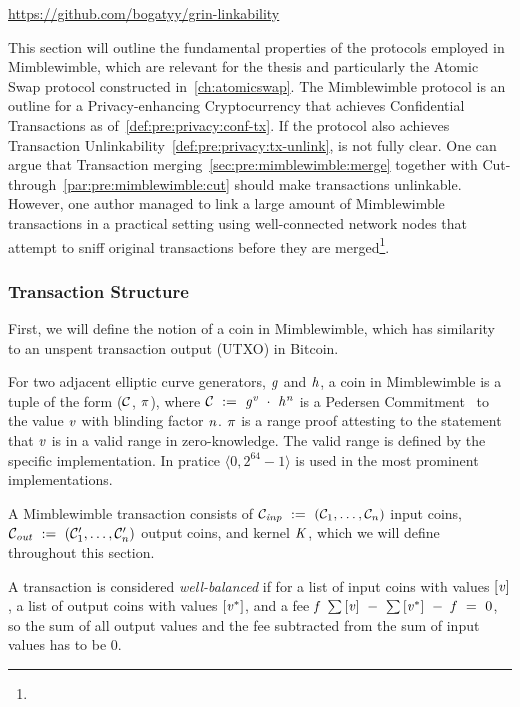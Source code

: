 \urldef\urlmwbreak\url{https://github.com/bogatyy/grin-linkability}

This section will outline the fundamental properties of the protocols employed in Mimblewimble, which are relevant for the thesis and particularly the Atomic Swap protocol constructed in~\cref{ch:atomicswap}.
The Mimblewimble protocol is an outline for a Privacy-enhancing Cryptocurrency that achieves Confidential Transactions as of~\cref{def:pre:privacy:conf-tx}.
If the protocol also achieves Transaction Unlinkability~\cref{def:pre:privacy:tx-unlink}, is not fully clear.
One can argue that Transaction merging~\cref{sec:pre:mimblewimble:merge} together with Cut-through~\cref{par:pre:mimblewimble:cut} should make transactions unlinkable.
However, one author managed to link a large amount of Mimblewimble transactions in a practical setting using well-connected network nodes that attempt to sniff original transactions before they are merged\footnote{\urlmwbreak}.

\subsubsection{Transaction Structure} \label{subsec:pre:mimblwimble-tx}

First, we will define the notion of a coin in Mimblewimble, which has similarity to an unspent transaction output (UTXO) in Bitcoin.
\begin{definition}\label{def:pre:coin}
    For two adjacent elliptic curve generators, $\mathit{g}$ and $\mathit{h}$, a coin in Mimblewimble is a tuple of the form ($\mathcal{C}$, $\pi$), where $\mathcal{C} ~:=~ \mathit{g}^{\mathit{v}} ~\cdot~ \mathit{h}^{\mathit{n}}$ is a Pedersen Commitment~\cite{pedersen1991non}
    to the value $\mathit{v}$ with blinding factor $\mathit{n}$. $\pi$ is a range proof attesting to the statement that $\mathit{v}$ is in a valid range in zero-knowledge.
    The valid range is defined by the specific implementation.
In pratice $\langle 0, 2^{64} -1 \rangle$ is used in the most prominent implementations.
\end{definition}

A Mimblewimble transaction consists of $\mathcal{C}_{\mathit{inp}} ~:=~ (\mathcal{C}_1 , \dots , \mathcal{C}_n)$ input coins, $\mathcal{C}_{\mathit{out}} ~:=~ (\mathcal{C}'_1 , \dots , \mathcal{C}'_n)$ output coins, and kernel $\mathit{K}$, which we will define throughout this section.
\begin{definition}  \label{def:pre:tx-well-balancedness}
    A transaction is considered \emph{well-balanced} if for a list of input coins with values $[\mathit{v}]$, a list of output coins with values $[\mathit{v}^*]$, and a fee $\mathit{f}$ $\sum{[\mathit{v}]} ~-~ \sum{[\mathit{v}^*]} ~-~ \mathit{f} ~=~ 0$, so the sum of all output values and the fee subtracted from the sum of input values has to be 0.
\end{definition}

